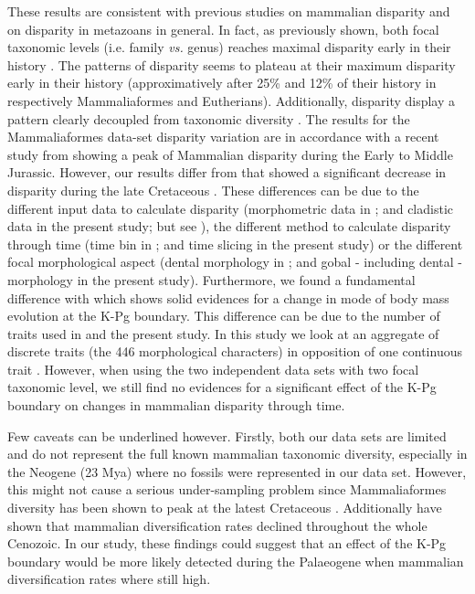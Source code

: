 \documentclass[12pt,letterpaper]{article}
\begin{document}
These results are consistent with previous studies on mammalian disparity and on disparity in metazoans in general.
In fact, as previously shown, both focal taxonomic levels (i.e. family \textit{vs.} genus) reaches maximal disparity early in their history \citep{Hughes20082013}.
The patterns of disparity seems to plateau at their maximum disparity early in their history (approximatively after 25\% and 12\% of their history in respectively Mammaliaformes and Eutherians).
Additionally, disparity display a pattern clearly decoupled from taxonomic diversity \citep{slaterCetacean,ruta2013,hopkinsdecoupling2013}.
The results for the Mammaliaformes data-set disparity variation are in accordance with a recent study from \cite{Close2015} showing a peak of Mammalian disparity during the Early to Middle Jurassic.
However, our results differ from \cite{Grossnickle2013} that showed a significant decrease in disparity during the late Cretaceous \citep[but see][]{Wilson2012}.
These differences can be due to the different input data to calculate disparity (morphometric data in \citealt{Grossnickle2013}; and cladistic data in the present study; but see \citealt{hetherington2015cladistic}), the different method to calculate disparity through time (time bin in \citealt{Grossnickle2013}; and time slicing in the present study) or the different focal morphological aspect (dental morphology in \citealt{Grossnickle2013}; and gobal - including dental - morphology in the present study).
Furthermore, we found a fundamental difference with \cite{Slater2012MEE} which shows solid evidences for a change in mode of body mass evolution at the K-Pg boundary.
This difference can be due to the number of traits used in \cite{Slater2012MEE} and the present study.
In this study we look at an aggregate of discrete traits (the 446 morphological characters) in opposition of one continuous trait \citep[body mass in][]{Slater2012MEE}.
However, when using the two independent data sets with two focal taxonomic level, we still find no evidences for a significant effect of the K-Pg boundary on changes in mammalian disparity through time.


Few caveats can be underlined however.
Firstly, both our data sets are limited and do not represent the full known mammalian taxonomic diversity, especially in the Neogene (23 Mya) where no fossils were represented in our data set.
However, this might not cause a serious under-sampling problem since Mammaliaformes diversity has been shown to peak at the latest Cretaceous \citep{Newham201432}.
Additionally \cite{Raia2012} have shown that mammalian diversification rates declined throughout the whole Cenozoic.
In our study, these findings could suggest that an effect of the K-Pg boundary would be more likely detected during the Palaeogene when mammalian diversification rates where still high.
\end{document}
